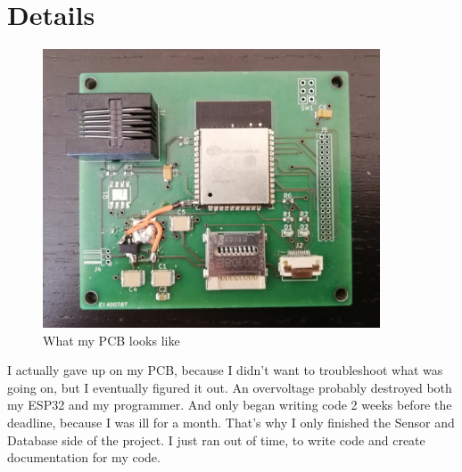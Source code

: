 \documentclass[a4paper,twoside, 12pt]{report}
\theoremstyle{break}
\begin{document}
\section{Details}
\begin{figure}[!ht]
  \centering
  \includegraphics[width=10cm]{SEM.jpg}
  \qquad
  \caption{What my PCB looks like}
\end{figure}
I actually gave up on my PCB, because I didn't want to troubleshoot what was going on, but I eventually figured it out. An overvoltage probably destroyed both my ESP32 and my programmer.
And only began writing code 2 weeks before the deadline, because I was ill for a month.
That's why I only finished the Sensor and Database side of the project. I just ran out of time, to write code and create documentation for my code.
\vfill
\end{document}
